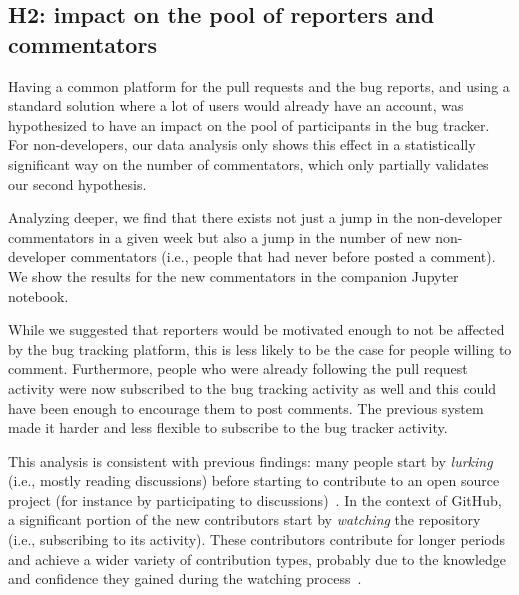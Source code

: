\documentclass[conference]{IEEEtran}
\begin{document}
\subsection{H2: impact on the pool of reporters and commentators}


Having a common platform for the pull requests and the bug reports, and using a standard solution where a lot of users would already have an account, was hypothesized to have an impact on the pool of participants in the bug tracker. For non-developers, our data analysis only shows this effect in a statistically significant way on the number of commentators, which only partially validates our second hypothesis.

Analyzing deeper, we find that there exists not just a jump in the non-developer commentators in a given week but also a jump in the number of new non-developer commentators (i.e., people that had never before posted a comment). We show the results for the new commentators in the companion Jupyter notebook.

While we suggested that reporters would be motivated enough to not be affected by the bug tracking platform, this is less likely to be the case for people willing to comment. Furthermore, people who were already following the pull request activity were now subscribed to the bug tracking activity as well and this could have been enough to encourage them to post comments. The previous system made it harder and less flexible to subscribe to the bug tracker activity.

This analysis is consistent with previous findings: many people start by \emph{lurking} (i.e., mostly reading discussions) before starting to contribute to an open source project (for instance by participating to discussions)~\cite{von2003community}. In the context of GitHub, a significant portion of the new contributors start by \emph{watching} the repository (i.e., subscribing to its activity). These contributors contribute for longer periods and achieve a wider variety of contribution types, probably due to the knowledge and confidence they gained during the watching process~\cite{sheoran2014understanding}.

\end{document}
